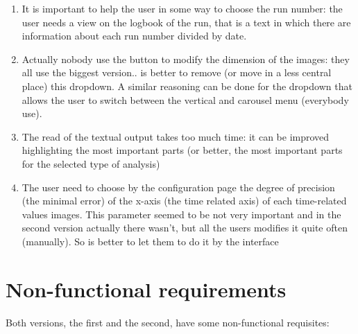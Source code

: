 \begin{enumerate}
\item 
It is important to help the user in some way to choose the run number: the user needs a view on the logbook of the run, that is a text in which there are information about each run number divided by date.

\item
Actually nobody use the button to modify the dimension of the images: they all use the biggest version.. is better to remove (or move in a less central place) this dropdown. A similar reasoning can be done for the dropdown that allows the user to switch between the vertical and carousel menu (everybody use).

\item
The read of the textual output takes too much time: it can be improved highlighting the most important parts (or better, the most important parts for the selected type of analysis)

\item
The user need to choose by the configuration page the degree of precision (the minimal error) of the x-axis (the time related axis) of each time-related values images. This parameter seemed to be not very important and in the second version actually there wasn't, but all the users modifies it quite often (manually). So is better to let them to do it by the interface

\end{enumerate}
 
\section{Non-functional requirements}

Both versions, the first and the second, have some non-functional requisites:


